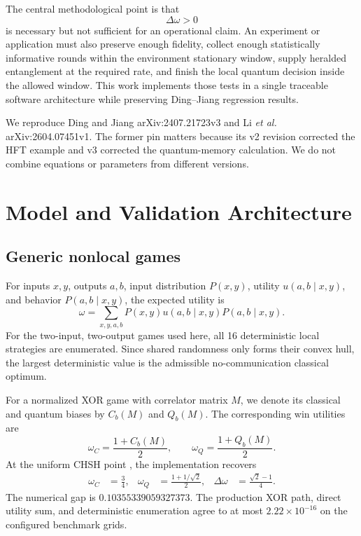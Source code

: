 \documentclass[10pt]{article}
\begin{document}
The central methodological point is that
\begin{equation}
  \Delta\omega > 0
\end{equation}
is necessary but not sufficient for an operational claim.  An experiment or
application must also preserve enough fidelity, collect enough statistically
informative rounds within the environment stationary window, supply heralded
entanglement at the required rate, and finish the local quantum decision
inside the allowed window.  This work implements those tests in a single
traceable software architecture while preserving Ding--Jiang regression
results.

We reproduce Ding and Jiang arXiv:2407.21723v3 and Li \emph{et al.}
arXiv:2604.07451v1.  The former pin matters because its v2 revision corrected
the HFT example and v3 corrected the quantum-memory calculation.  We do not
combine equations or parameters from different versions.

\section{Model and Validation Architecture}

\subsection{Generic nonlocal games}

For inputs $x,y$, outputs $a,b$, input distribution $P(x,y)$, utility
$u(a,b\mid x,y)$, and behavior $P(a,b\mid x,y)$, the expected utility is
\begin{equation}
  \omega = \sum_{x,y,a,b} P(x,y)u(a,b\mid x,y)P(a,b\mid x,y).
  \label{eq:utility}
\end{equation}
For the two-input, two-output games used here, all 16 deterministic local
strategies are enumerated.  Since shared randomness only forms their convex
hull, the largest deterministic value is the admissible no-communication
classical optimum.

For a normalized XOR game with correlator matrix $M$, we denote its classical
and quantum biases by $C_b(M)$ and $Q_b(M)$.  The corresponding win utilities
are
\begin{equation}
  \omega_C=\frac{1+C_b(M)}{2}, \qquad
  \omega_Q=\frac{1+Q_b(M)}{2}.
  \label{eq:xorutilities}
\end{equation}
At the uniform CHSH point \cite{chsh1969}, the implementation recovers
\begin{align}
  \omega_C &= \frac{3}{4}, &
  \omega_Q &= \frac{1+1/\sqrt{2}}{2}, &
  \Delta\omega &= \frac{\sqrt{2}-1}{4}.
  \label{eq:chsh}
\end{align}
The numerical gap is $0.10355339059327373$.  The production XOR path, direct
utility sum, and deterministic enumeration agree to at most
$2.22\times10^{-16}$ on the configured benchmark grids.
\end{document}
